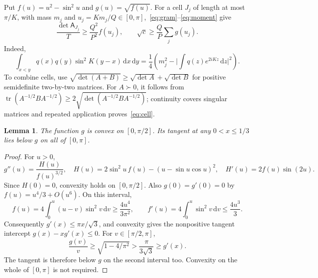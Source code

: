 \documentclass[11pt,a4paper]{article}
\newtheorem{lemma}[theorem]{Lemma}
\theoremstyle{remark}
\newcommand{\abs}[1]{\lvert #1\rvert}
\newcommand{\dd}{\,\mathrm d}
\newcommand{\tr}{\operatorname{tr}}
\begin{document}
Put $f(u)=u^2-\sin^2u$ and $g(u)=\sqrt{f(u)}$. For a cell $J_j$ of length at most $\pi/K$, with mass $m_j$ and $u_j=Km_j/Q\in[0,\pi]$,~\eqref{eq:gram}--\eqref{eq:moment} give
\begin{equation}\label{eq:cell}
 \frac{\det\mathsf A_{J_j}}T\geq\frac{Q^2}{P^2}f(u_j),\qquad
 \sqrt c\geq\frac QP\sum_j g(u_j).
\end{equation}
Indeed,
\[
 \int_{x<y}q(x)q(y)\sin^2K(y-x)\dd x\dd y
 =\frac14\left(m_j^2-\abs{\int q(z)e^{2iKz}\dd z}^2\right).
\]
To combine cells, use $\sqrt{\det(A+B)}\geq\sqrt{\det A}+\sqrt{\det B}$ for positive semidefinite two-by-two matrices. For $A\succ0$, it follows from $\tr(A^{-1/2}BA^{-1/2})\geq2\sqrt{\det(A^{-1/2}BA^{-1/2})}$; continuity covers singular matrices and repeated application proves~\eqref{eq:cell}.

\begin{lemma}\label{lem:tangent}
The function $g$ is convex on $[0,\pi/2]$. Its tangent at any $0<x\leq1/3$ lies below $g$ on all of $[0,\pi]$.
\end{lemma}
\begin{proof}
For $u>0$,
\[
 g''(u)=\frac{H(u)}{f(u)^{3/2}},\quad
 H(u)=2\sin^2u\,f(u)-(u-\sin u\cos u)^2,\quad
 H'(u)=2f(u)\sin(2u).
\]
Since $H(0)=0$, convexity holds on $[0,\pi/2]$. Also $g(0)=g'(0)=0$ by $f(u)=u^4/3+O(u^6)$. On this interval,
\[
 f(u)=4\int_0^u(u-v)\sin^2v\dd v\geq\frac{4u^4}{3\pi^2},\qquad
 f'(u)=4\int_0^u\sin^2v\dd v\leq\frac{4u^3}{3}.
\]
Consequently $g'(x)\leq\pi x/\sqrt3$, and convexity gives the nonpositive tangent intercept $g(x)-xg'(x)\leq0$. For $v\in[\pi/2,\pi]$,
\[
 \frac{g(v)}v\geq\sqrt{1-4/\pi^2}>\frac\pi{3\sqrt3}\geq g'(x).
\]
The tangent is therefore below $g$ on the second interval too. Convexity on the whole of $[0,\pi]$ is not required.
\end{proof}
\end{document}
